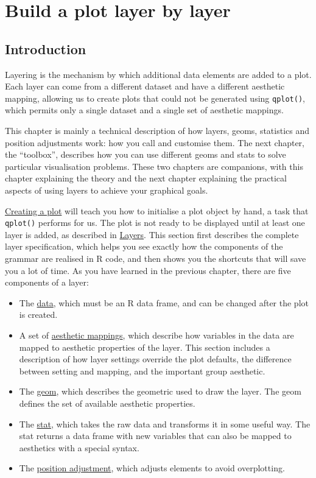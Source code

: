 \chapter{Build a plot layer by layer}\label{cha:layers}

\section{Introduction}

Layering is the mechanism by which additional data elements are added to
a plot. Each layer can come from a different dataset and have a
different aesthetic mapping, allowing us to create plots that could not
be generated using \texttt{qplot()}, which permits only a single dataset
and a single set of aesthetic mappings.

This chapter is mainly a technical description of how layers, geoms,
statistics and position adjustments work: how you call and customise
them. The next chapter, the ``toolbox'', describes how you can use
different geoms and stats to solve particular visualisation problems.
These two chapters are companions, with this chapter explaining the
theory and the next chapter explaining the practical aspects of using
layers to achieve your graphical goals.

\hyperref[sec:ggplot]{Creating a plot} will teach you how to initialise
a plot object by hand, a task that \texttt{qplot()} performs for us. The
plot is not ready to be displayed until at least one layer is added, as
described in \hyperref[sec:layers]{Layers}. This section first describes
the complete layer specification, which helps you see exactly how the
components of the grammar are realised in R code, and then shows you the
shortcuts that will save you a lot of time. As you have learned in the
previous chapter, there are five components of a layer:

\begin{itemize}
\itemsep1pt\parskip0pt
\item
  The \hyperref[sec:data]{data}, which must be an R data frame, and can
  be changed after the plot is created.
\item
  A set of \hyperref[sec:aes]{aesthetic mappings}, which describe how
  variables in the data are mapped to aesthetic properties of the layer.
  This section includes a description of how layer settings override the
  plot defaults, the difference between setting and mapping, and the
  important group aesthetic.
\item
  The \hyperref[sec:geom]{geom}, which describes the geometric used to
  draw the layer. The geom defines the set of available aesthetic
  properties.
\item
  The \hyperref[sec:stat]{stat}, which takes the raw data and transforms
  it in some useful way. The stat returns a data frame with new
  variables that can also be mapped to aesthetics with a special syntax.
\item
  The \hyperref[sec:position]{position adjustment}, which adjusts
  elements to avoid overplotting.
\end{itemize}

